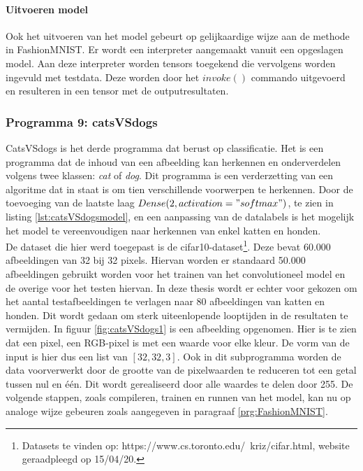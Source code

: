 				\newpage
			
				\paragraph{Uitvoeren model}
					Ook het uitvoeren van het model gebeurt op gelijkaardige wijze aan de methode in FashionMNIST. Er wordt een interpreter aangemaakt vanuit een opgeslagen model. Aan deze interpreter worden tensors toegekend die vervolgens worden ingevuld met testdata. Deze worden door het $invoke()$ commando uitgevoerd en resulteren in een tensor met de outputresultaten.
				
		\subsubsection{Programma 9: catsVSdogs}
			CatsVSdogs is het derde programma dat berust op classificatie. Het is een programma dat de inhoud van een afbeelding kan herkennen en onderverdelen volgens twee klassen: \textit{cat} of \textit{dog}. Dit programma is een verderzetting van een algoritme dat in staat is om tien verschillende voorwerpen te herkennen. Door de toevoeging van de laatste laag $Dense(2, activation="softmax")$, te zien in listing \ref{lst:catsVSdogsmodel}, en een aanpassing van de datalabels is het mogelijk het model te vereenvoudigen naar herkennen van enkel katten en honden. \\
			\newpage
			De dataset die hier werd toegepast is de cifar10-dataset\footnote{Datasets te vinden op: https://www.cs.toronto.edu/~kriz/cifar.html, website geraadpleegd op 15/04/20.}. Deze bevat 60.000 afbeeldingen van 32 bij 32 pixels. Hiervan worden er standaard 50.000 afbeeldingen gebruikt worden voor het trainen van het convolutioneel model en de overige voor het testen hiervan. In deze thesis wordt er echter voor gekozen om het aantal testafbeeldingen te verlagen naar 80 afbeeldingen van katten en honden. Dit wordt gedaan om sterk uiteenlopende looptijden in de resultaten te vermijden. In figuur \ref{fig:catsVSdogs1} is een afbeelding opgenomen. Hier is te zien dat een pixel, een RGB-pixel is met een waarde voor elke kleur. De vorm van de input is hier dus een list van $[32, 32, 3]$. Ook in dit subprogramma worden de data voorverwerkt door de grootte van de pixelwaarden te reduceren tot een getal tussen nul en \'e\'en. Dit wordt gerealiseerd door alle waardes te delen door 255. De volgende stappen, zoals compileren, trainen en runnen van het model, kan nu op analoge wijze gebeuren zoals aangegeven in paragraaf \ref{prg:FashionMNIST}.

